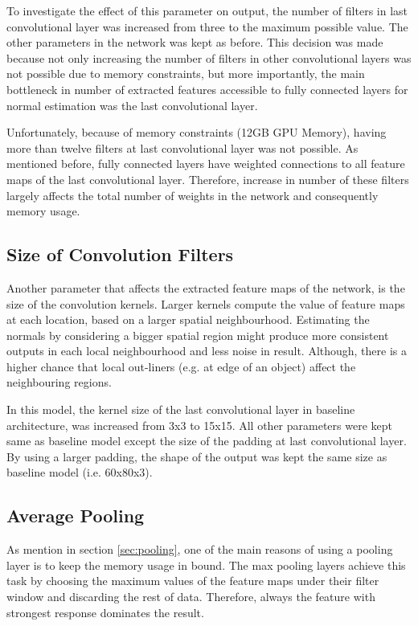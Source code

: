To investigate the effect of this parameter on output, the number of filters in last convolutional layer was increased from three to the maximum possible value. The other parameters in the network was kept as before. This decision was made because not only increasing the number of filters in other convolutional layers was not possible due to memory constraints, but more importantly, the main bottleneck in number of extracted features accessible to fully connected layers for normal estimation was the last convolutional layer. 

Unfortunately, because of memory constraints (12GB GPU Memory), having more than twelve filters at last convolutional layer was not possible. As mentioned before, fully connected layers have weighted connections to all feature maps of the last convolutional layer. Therefore, increase in number of these filters largely affects the total number of weights in the network and consequently memory usage.

\subsection{Size of Convolution Filters}

Another parameter that affects the extracted feature maps of the network, is the size of the convolution kernels. Larger kernels compute the value of feature maps at each location, based on a larger spatial neighbourhood. Estimating the normals by considering a bigger spatial region might produce more consistent outputs in each local neighbourhood and less noise in result. Although, there is a higher chance that local out-liners (e.g. at edge of an object) affect the neighbouring regions. 

In this model, the kernel size of the last convolutional layer in baseline architecture, was increased from 3x3 to 15x15. All other parameters were kept same as baseline model except the size of the padding at last convolutional layer. By using a larger padding, the shape of the output was kept the same size as baseline model (i.e. 60x80x3).

\subsection{Average Pooling}

As mention in section \ref{sec:pooling}, one of the main reasons of using a pooling layer is to keep the memory usage in bound. The max pooling layers achieve this task by choosing the maximum values of the feature maps under their filter window and discarding the rest of data. Therefore, always the feature with strongest response dominates the result. 

